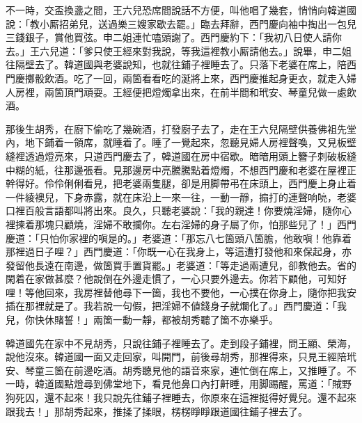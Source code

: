 不一時，交盃換盞之間，王六兒恐席間說話不方便，{}叫他唱了幾套，悄悄向韓道國說：「教小厮招弟兒，送過樂三嫂家歇去罷。」臨去拜辭，西門慶向袖中掏出一包兒三錢銀子，賞他買弦。申二姐連忙嗑頭謝了。西門慶約下：「我初八日使人請你去。」王六兒道：「爹只使王經來對我說，等我這裡教小厮請他去。」說畢，申二姐往隔壁去了。韓道國與老婆說知，也就往鋪子裡睡去了。{}只落下老婆在席上，陪西門慶擲骰飲酒。吃了一回，兩箇看看吃的涎將上來，西門慶推起身更衣，就走入婦人房裡，兩箇頂門頑耍。王經便把燈燭拿出來，在前半間和玳安、琴童兒做一處飲酒。

那後生胡秀，在廚下偷吃了幾碗酒，{}打發廚子去了，走在王六兒隔壁供養佛祖先堂內，地下鋪着一領席，就睡着了。睡了一覺起來，忽聽見婦人房裡聲喚，又見板壁縫裡透過燈亮來，只道西門慶去了，韓道國在房中宿歇。暗暗用頭上簪子刺破板縫中糊的紙，往那邊張看。見那邊房中亮騰騰點着燈燭，不想西門慶和老婆在屋裡正幹得好。{}伶伶俐俐看見，把老婆兩隻腿，卻是用脚帶弔在床頭上，西門慶上身止着一件綾襖兒，下身赤露，就在床沿上一來一往，一動一靜，搧打的連聲响喨，老婆口裡百般言語都叫將出來。良久，只聽老婆說：「我的親達！你要燒淫婦，隨你心裡揀着那塊只顧燒，淫婦不敢攔你。左右淫婦的身子屬了你，怕那些兒了！」西門慶道：「只怕你家裡的嗔是的。」{}老婆道：「那忘八七箇頭八箇膽，他敢嗔！他靠着那裡過日子哩？」西門慶道：「你既一心在我身上，等這遭打發他和來保起身，亦發留他長遠在南邊，做箇買手置貨罷。」{}老婆道：「等走過兩遭兒，卻教他去。省的閑着在家做甚麼？他說倒在外邊走慣了，一心只要外邊去。你若下顧他，可知好哩！等他回來，我房裡替他尋下一箇，我也不要他，一心撲在你身上，隨你把我安插在那裡就是了。我若說一句假，把淫婦不値錢身子就爛化了。」{}西門慶道：「我兒，你快休賭誓！」兩箇一動一靜，都被胡秀聽了箇不亦樂乎。

韓道國先在家中不見胡秀，只說往鋪子裡睡去了。走到段子鋪裡，問王顯、榮海，說他沒來。韓道國一面又走回家，叫開門，前後尋胡秀，那裡得來，只見王經陪玳安、琴童三箇在前邊吃酒。胡秀聽見他的語音來家，連忙倒在席上，又推睡了。不一時，韓道國點燈尋到佛堂地下，看見他鼻口內打鼾睡，用脚踢醒，罵道：「賊野狗死囚，還不起來！我只說先往鋪子裡睡去，你原來在這裡挺得好覺兒。還不起來跟我去！」那胡秀起來，推揉了揉眼，楞楞睜睜跟道國往鋪子裡去了。

